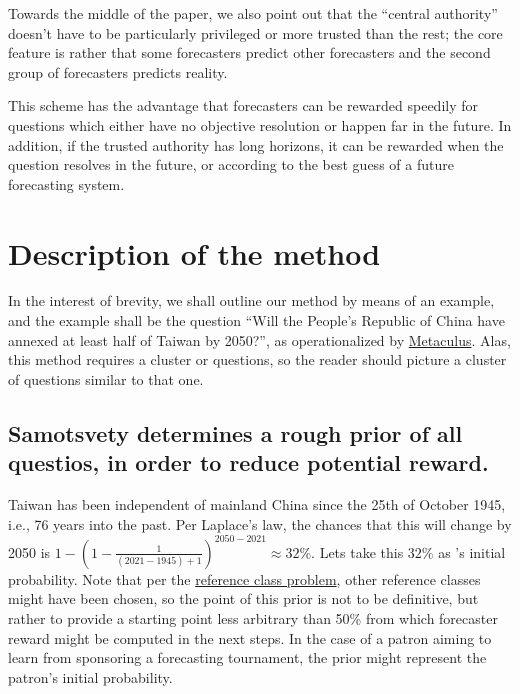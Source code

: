 \documentclass[]{article}
\begin{document}
Towards the middle of the paper, we also point out that the ``central
authority'' doesn't have to be particularly privileged or more trusted
than the rest; the core feature is rather that some forecasters predict
other forecasters and the second group of forecasters predicts reality.

This scheme has the advantage that forecasters can be rewarded speedily
for questions which either have no objective resolution or happen far in
the future. In addition, if the trusted authority has long horizons, it
can be rewarded when the question resolves in the future, or according
to the best guess of a future forecasting system.

\hypertarget{description-of-the-method}{%
\section{Description of the method}\label{description-of-the-method}}

In the interest of brevity, we shall outline our method by means of an
example, and the example shall be the question ``Will the People's
Republic of China have annexed at least half of Taiwan by 2050?'', as
operationalized by
\href{https://www.metaculus.com/questions/5320/chinese-annexation-of-most-of-taiwan-by-2050/}{Metaculus}.
Alas, this method requires a cluster or questions, so the reader should
picture a cluster of questions similar to that one.

\hypertarget{samotsvety-determines-a-rough-prior-of-all-questios-in-order-to-reduce-potential-reward.}{%
\subsection{Samotsvety determines a rough prior of all questios, in
order to reduce potential
reward.}\label{samotsvety-determines-a-rough-prior-of-all-questios-in-order-to-reduce-potential-reward.}}

Taiwan has been independent of mainland China since the 25th of October
1945, i.e., 76 years into the past. Per Laplace's law, the chances that
this will change by 2050 is
\(1-(1-\frac{1}{(2021-1945)+1})^{2050-2021} \approx 32\%\). Lets take
this \(32\%\) as 's initial probability. Note that per the
\href{https://en.wikipedia.org/wiki/Reference_class_problem}{reference
class problem}, other reference classes might have been chosen, so the
point of this prior is not to be definitive, but rather to provide a
starting point less arbitrary than 50\% from which forecaster reward
might be computed in the next steps. In the case of a patron aiming to
learn from sponsoring a forecasting tournament, the prior might
represent the patron's initial probability.
\end{document}
